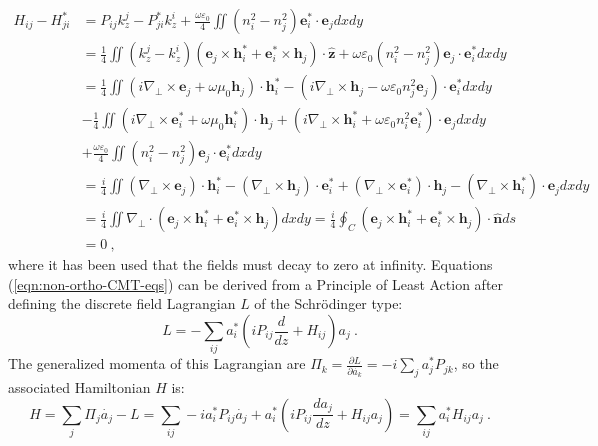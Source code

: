\begin{align*}
 H_{ij} - H_{ji}^* &= P_{ij} k_z^j - P_{ji}^* k_z^i  + \frac{\omega \varepsilon_0}{4} \iint(n_i^2-n_j^2) \textbf{e}_i^* \cdot \textbf{e}_j dxdy
\\
&= \frac{1}{4} \iint (k_z^j-k_z^i)( \textbf{e}_j \times  \textbf{h}_i^* + \textbf{e}_i^* \times  \textbf{h}_j  )\cdot\hat{\textbf{z}} + \omega\varepsilon_0 (n_i^2-n_j^2) \textbf{e}_j \cdot \textbf{e}_i^* dxdy
\\
&= \frac{1}{4} \iint \left( i\nabla_\perp \times \textbf{e}_j +\omega\mu_0 \textbf{h}_j \right) \cdot \textbf{h}_i^* - \left( i\nabla_\perp \times \textbf{h}_j  - \omega\varepsilon_0n_j^2 \textbf{e}_j \right) \cdot \textbf{e}_i^*dxdy
\\
&- \frac{1}{4} \iint \left( i\nabla_\perp \times \textbf{e}_i^* +\omega\mu_0 \textbf{h}_i^*\right) \cdot \textbf{h}_j + \left(i\nabla_\perp \times \textbf{h}_i^*  + \omega\varepsilon_0n_i^2 \textbf{e}_i^* \right) \cdot \textbf{e}_jdxdy
\\
&+\frac{\omega\varepsilon_0}{4}\iint  \left(n_i^2-n_j^2\right) \textbf{e}_j \cdot \textbf{e}_i^* dxdy
\\
&= \frac{i}{4} \iint \left(\nabla_\perp\times\textbf{e}_j\right) \cdot \textbf{h}_i^*  -\left(\nabla_\perp\times\textbf{h}_j\right) \cdot \textbf{e}_i^* + \left(\nabla_\perp\times\textbf{e}_i^*\right) \cdot \textbf{h}_j - \left(\nabla_\perp\times\textbf{h}_i^*\right) \cdot \textbf{e}_j dxdy
\\
&= \frac{i}{4} \iint \nabla_\perp\cdot\left(\textbf{e}_j \times \textbf{h}_i^* +\textbf{e}_i^* \times \textbf{h}_j\right) dxdy =
\frac{i}{4} \oint_C \left(\textbf{e}_j \times \textbf{h}_i^* +\textbf{e}_i^* \times \textbf{h}_j\right) \cdot \hat{\textbf{n}} ds
\\
&=
0 \ ,
	\end{align*}
where it has been used that the fields must decay to zero at infinity. Equations (\ref{eqn:non-ortho-CMT-eqs}) can be derived from a Principle of Least Action after defining the discrete field Lagrangian $L$ of the Schrödinger type:
\begin{equation}
	L = -\sum_{ij}  a_i^*\left(i  P_{ij} \frac{d }{dz} + H_{ij}  \right)a_j \ .
\end{equation}
The generalized momenta of this Lagrangian are $\Pi_k=\frac{\partial L}{\partial \dot{a_k}} = -i\sum_{j} a_j^* P_{jk}$, so the associated Hamiltonian $H$ is:
\begin{equation}
H = \sum_{j} \Pi_j \dot{a_j} - L = \sum_{ij} -ia_i^* P_{ij} \dot{a_j} + a_i^*\left(i  P_{ij} \frac{d a_j}{dz} + H_{ij} a_j \right) = \sum_{ij} a_i^* H_{ij} a_j \ .
\end{equation}
